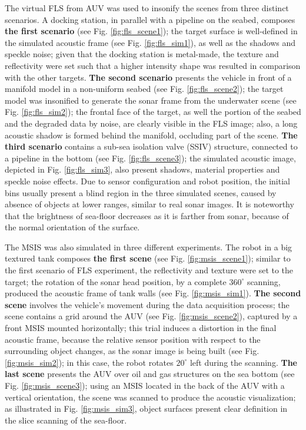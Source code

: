 \documentclass[final,5p,times]{elsarticle}
\begin{document}
The virtual FLS from AUV was used to insonify the scenes from three distinct
scenarios. A docking station, in parallel with a pipeline on the seabed,
composes \textbf{the first scenario} (see Fig. \ref{fig:fls_scene1}); the
target surface is well-defined in the simulated acoustic frame (see
Fig. \ref{fig:fls_sim1}), as well as the shadows and speckle noise; given that the docking station is metal-made, the texture and reflectivity were set such
that a higher intensity shape was resulted in comparison with the other targets.
\textbf{The second scenario} presents the vehicle in front of a manifold model
in a non-uniform seabed (see Fig. \ref{fig:fls_scene2}); the target model was
insonified to generate the sonar frame from the underwater scene (see Fig. \ref{fig:fls_sim2}); the frontal
face of the target, as well the portion of the seabed and the degraded data
by noise, are clearly visible in the FLS image; also, a long acoustic shadow
is formed behind the manifold, occluding part of the scene. \textbf{The
third scenario} contains a sub-sea isolation valve (SSIV) structure, connected
to a pipeline in the bottom (see Fig. \ref{fig:fls_scene3}); the simulated
acoustic image, depicted in Fig. \ref{fig:fls_sim3}, also present shadows,
material properties and speckle noise effects. Due to sensor configuration and
robot position, the initial bins usually present a blind region in the three
simulated scenes, caused by absence of objects at lower ranges, similar to real
sonar images. It is noteworthy that the brightness of sea-floor decreases as it is
farther from sonar, because of the normal orientation of the surface.

The MSIS was also simulated in three different experiments. The robot in a
big textured tank composes \textbf{the first scene} (see Fig.
\ref{fig:msis_scene1}); similar to the first scenario of FLS experiment,
the reflectivity and texture were set to the target; the rotation of the
sonar head position, by a complete $360^{\circ}$ scanning, produced the acoustic
frame of tank walls (see Fig. \ref{fig:msis_sim1}). \textbf{The second scene}
involves the vehicle's movement during the data acquisition process; the scene
contains a grid around the AUV (see Fig. \ref{fig:msis_scene2}), captured by a front MSIS mounted horizontally; this trial induces a distortion in the final
acoustic frame, because the relative sensor position with respect to the
surrounding object changes, as the sonar image is being built (see
Fig. \ref{fig:msis_sim2}); in this case, the robot rotates $20^{\circ}$ left
during the scanning. \textbf{The last scene} presents the AUV over oil
and gas structures on the sea bottom (see Fig. \ref{fig:msis_scene3});
using an MSIS located in the back of the AUV with a vertical orientation, the scene was scanned to produce the acoustic visualization; as illustrated in Fig. \ref{fig:msis_sim3}, object surfaces present clear definition in the slice scanning of the sea-floor.
\end{document}
